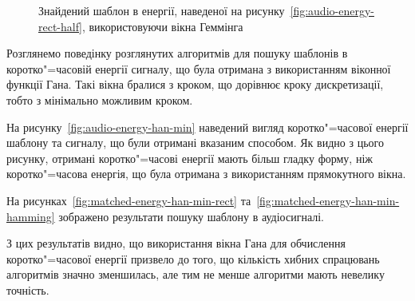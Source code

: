 \begin{figure}[h]

            \caption{Знайдений шаблон в енергії, наведеної на рисунку~\ref{fig:audio-energy-rect-half}, використовуючи
                вікна Геммінга}
            \label{fig:matched-energy-rect-half-hamming}
        \end{figure}

        \clearpage

        Розглянемо поведінку розглянутих алгоритмів для пошуку шаблонів в коротко"=часовій енергії сигналу, що була
        отримана з використанням віконної функції Гана.
        Такі вікна бралися з кроком, що дорівнює кроку дискретизації, тобто з мінімально можливим кроком.

        На рисунку~\ref{fig:audio-energy-han-min} наведений вигляд коротко"=часової енергії шаблону та сигналу, що
        були отримані вказаним способом.
        Як видно з цього рисунку, отримані коротко"=часові енергії мають більш гладку форму, ніж коротко"=часова
        енергія, що була отримана з використанням прямокутного вікна.

        На рисунках~\ref{fig:matched-energy-han-min-rect} та~\ref{fig:matched-energy-han-min-hamming} зображено
        результати пошуку шаблону в аудіосигналі.

        З цих результатів видно, що використання вікна Гана для обчислення коротко"=часової енергії призвело до того,
        що кількість хибних спрацювань алгоритмів значно зменшилась, але тим не менше алгоритми мають невелику
        точність.

